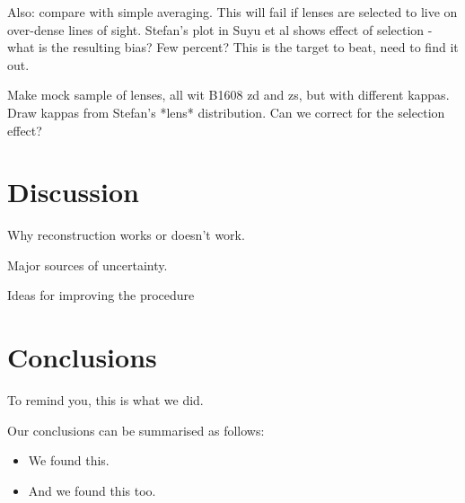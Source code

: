 \documentclass[useAMS,usenatbib]{mn2e}
\begin{document}
Also: compare with simple averaging. This will fail if lenses are selected to
live on over-dense lines of sight. Stefan's plot in Suyu et al shows effect of
selection - what is the resulting bias? Few percent? This is the target to beat,
need to find it out.

Make mock sample of lenses, all wit B1608 zd and zs, but with different kappas.
Draw kappas from Stefan's *lens* distribution. Can we correct for the selection
effect?





\section{Discussion}
\label{sec:discuss}

Why reconstruction works or doesn't work.

Major sources of uncertainty.

Ideas for improving the procedure



\section{Conclusions}
\label{sec:conclude}

To remind you, this is what we did.

Our conclusions can be summarised as follows:

\begin{itemize}

\item We found this.

\item And we found this too.

\end{itemize}

\end{document}
